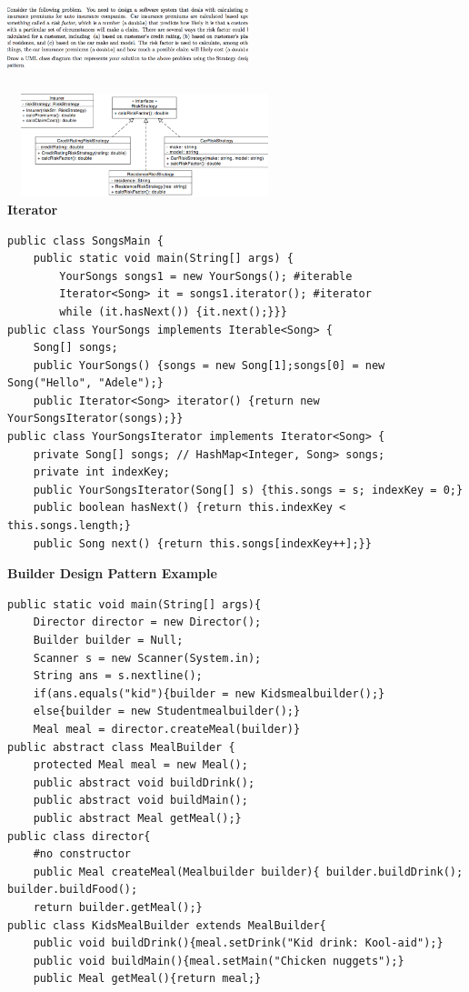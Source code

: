 \documentclass{article}
\begin{document}
\includegraphics[width=7cm,height =3cm]{Riskq.png}
\includegraphics[width=8cm,height =3cm]{Riskuml.png}\\
\textbf{Iterator}
\begin{verbatim}
public class SongsMain {
    public static void main(String[] args) {
        YourSongs songs1 = new YourSongs(); #iterable
        Iterator<Song> it = songs1.iterator(); #iterator
		while (it.hasNext()) {it.next();}}}  
public class YourSongs implements Iterable<Song> {
    Song[] songs;
    public YourSongs() {songs = new Song[1];songs[0] = new Song("Hello", "Adele");}
    public Iterator<Song> iterator() {return new YourSongsIterator(songs);}}
public class YourSongsIterator implements Iterator<Song> {
    private Song[] songs; // HashMap<Integer, Song> songs;
    private int indexKey;
    public YourSongsIterator(Song[] s) {this.songs = s; indexKey = 0;}
	public boolean hasNext() {return this.indexKey < this.songs.length;}
    public Song next() {return this.songs[indexKey++];}}

\end{verbatim}
\textbf{Builder Design Pattern Example}
\begin{verbatim}
public static void main(String[] args){
    Director director = new Director();
    Builder builder = Null;
    Scanner s = new Scanner(System.in);
    String ans = s.nextline();
    if(ans.equals("kid"){builder = new Kidsmealbuilder();}
    else{builder = new Studentmealbuilder();}
    Meal meal = director.createMeal(builder)}
public abstract class MealBuilder {
    protected Meal meal = new Meal();	
    public abstract void buildDrink();
    public abstract void buildMain();
    public abstract Meal getMeal();}
public class director{
    #no constructor
    public Meal createMeal(Mealbuilder builder){ builder.buildDrink(); builder.buildFood();
    return builder.getMeal();}
public class KidsMealBuilder extends MealBuilder{
    public void buildDrink(){meal.setDrink("Kid drink: Kool-aid");}
    public void buildMain(){meal.setMain("Chicken nuggets");}
    public Meal getMeal(){return meal;}
\end{verbatim}
\end{document}
